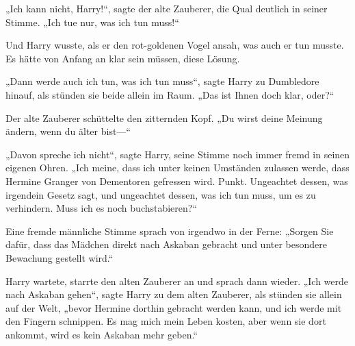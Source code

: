 „Ich kann nicht, Harry!“, sagte der alte Zauberer, die Qual deutlich in seiner Stimme.
„Ich tue nur, was ich tun muss!“

Und Harry wusste, als er den rot-goldenen Vogel ansah, was auch er tun musste. Es hätte von Anfang an klar sein müssen, diese Lösung.

„Dann werde auch ich tun, was ich tun muss“, sagte Harry zu Dumbledore hinauf, als stünden sie beide allein im Raum.
„Das ist Ihnen doch klar, oder?“

Der alte Zauberer schüttelte den zitternden Kopf.
„Du wirst deine Meinung ändern, wenn du älter bist—“

„Davon spreche ich nicht“, sagte Harry, seine Stimme noch immer fremd in seinen eigenen Ohren.
„Ich meine, dass ich unter keinen Umständen zulassen werde, dass Hermine Granger von Dementoren gefressen wird. Punkt. Ungeachtet dessen, was irgendein Gesetz sagt, und ungeachtet dessen, was ich tun muss, um es zu verhindern. Muss ich es noch buchstabieren?“

Eine fremde männliche Stimme sprach von irgendwo in der Ferne:
„Sorgen Sie dafür, dass das Mädchen direkt nach Askaban gebracht und unter besondere Bewachung gestellt wird.“

Harry wartete, starrte den alten Zauberer an und sprach dann wieder.
„Ich werde nach Askaban gehen“, sagte Harry zu dem alten Zauberer, als stünden sie allein auf der Welt, „bevor Hermine dorthin gebracht werden kann, und ich werde mit den Fingern schnippen. Es mag mich mein Leben kosten, aber wenn sie dort ankommt, wird es kein Askaban mehr geben.“

